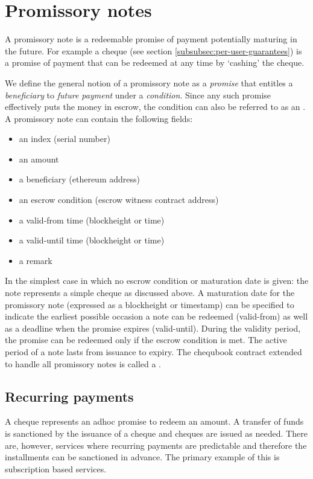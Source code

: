 \section{Promissory notes}

A promissory note is a redeemable promise of payment potentially maturing in the future. For example a cheque (see section \ref{subsubsec:per-user-guarantees}) is a promise of payment that can be redeemed at any time by `cashing' the cheque. 

We define the general notion of a promissory note as a \emph{promise} that entitles a \emph{beneficiary} to \emph{future payment} under a \emph{condition}. Since any such promise effectively puts the money in escrow, the condition can also be referred to as an  . A promissory note can contain the following fields:

  \begin{itemize}
    \item an index (serial number)
    \item an amount
    \item a beneficiary (ethereum address)
    \item an escrow condition (escrow witness contract address)
    \item a valid-from time (blockheight or time)
    \item a valid-until time (blockheight or time)
    \item a remark
  \end{itemize}

In the simplest case in which no escrow condition or maturation date is given: the note represents a simple cheque as discussed above.
A maturation date for the promissory note (expressed as a blockheight or timestamp) can be specified to indicate the earliest possible occasion a note can be redeemed (valid-from) as well as a deadline when the promise expires (valid-until).
During the validity period, the promise can be redeemed only if the escrow condition is met. The active period of a note lasts from issuance to expiry.
The chequbook contract extended to handle all promissory notes is called a .

\subsection{Recurring payments}

A cheque represents an adhoc promise to redeem an amount. A transfer of funds is sanctioned by the issuance of a cheque and cheques are issued as needed. There are, however, services where recurring payments are predictable and therefore the installments can be sanctioned in advance. The primary example of this is subscription based services. 

